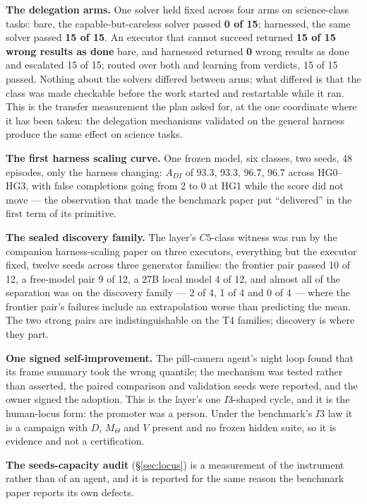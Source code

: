 \documentclass[11pt]{article}
\theoremstyle{definition}
\begin{document}
\textbf{The delegation arms.} One solver held fixed across four arms on science-class tasks: bare, the capable-but-careless solver passed \textbf{0 of 15}; harnessed, the same solver passed \textbf{15 of 15}. An executor that cannot succeed returned \textbf{15 of 15 wrong results as done} bare, and harnessed returned \textbf{0} wrong results as done and escalated 15 of 15; routed over both and learning from verdicts, 15 of 15 passed. Nothing about the solvers differed between arms; what differed is that the class was made checkable before the work started and restartable while it ran. This is the transfer measurement the plan asked for, at the one coordinate where it has been taken: the delegation mechanisms validated on the general harness produce the same effect on science tasks.

\textbf{The first harness scaling curve.} One frozen model, six classes, two seeds, 48 episodes, only the harness changing: $A_{DI}$ of 93.3, 93.3, 96.7, 96.7 across HG0--HG3, with false completions going from 2 to 0 at HG1 while the score did not move --- the observation that made the benchmark paper put ``delivered'' in the first term of its primitive.

\textbf{The sealed discovery family.} The layer's $C5$-class witness was run by the companion harness-scaling paper on three executors, everything but the executor fixed, twelve seeds across three generator families: the frontier pair passed 10 of 12, a free-model pair 9 of 12, a 27B local model 4 of 12, and almost all of the separation was on the discovery family --- 2 of 4, 1 of 4 and 0 of 4 --- where the frontier pair's failures include an extrapolation worse than predicting the mean. The two strong pairs are indistinguishable on the T4 families; discovery is where they part.

\textbf{One signed self-improvement.} The pill-camera agent's night loop found that its frame summary took the wrong quantile; the mechanism was tested rather than asserted, the paired comparison and validation seeds were reported, and the owner signed the adoption. This is the layer's one $I3$-shaped cycle, and it is the human-locus form: the promoter was a person. Under the benchmark's $I3$ law it is a campaign with $D$, $M_\Theta$ and $V$ present and no frozen hidden suite, so it is evidence and not a certification.

\textbf{The seeds-capacity audit} (\S\ref{sec:locus}) is a measurement of the instrument rather than of an agent, and it is reported for the same reason the benchmark paper reports its own defects.
\end{document}
